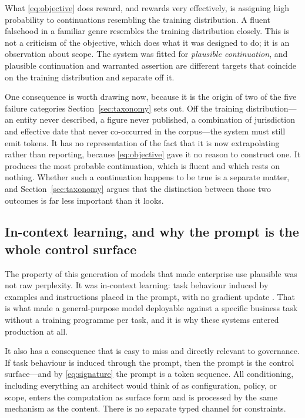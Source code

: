 \documentclass[11pt]{article}
\theoremstyle{plain}
\theoremstyle{definition}
\begin{document}
What \eqref{eq:objective} does reward, and rewards very effectively, is assigning
high probability to continuations resembling the training distribution. A fluent
falsehood in a familiar genre resembles the training distribution closely. This is
not a criticism of the objective, which does what it was designed to do; it is an
observation about scope. The system was fitted for \emph{plausible continuation},
and plausible continuation and warranted assertion are different targets that
coincide on the training distribution and separate off it.

One consequence is worth drawing now, because it is the origin of two of the
five failure categories Section~\ref{sec:taxonomy} sets out. Off the training
distribution---an entity never described, a figure never published, a combination
of jurisdiction and effective date that never co-occurred in the corpus---the
system must still emit tokens. It has no representation of the fact that it is now
extrapolating rather than reporting, because \eqref{eq:objective} gave it no
reason to construct one. It produces the most probable continuation, which is
fluent and which rests on nothing. Whether such a continuation happens to be true
is a separate matter, and Section~\ref{sec:taxonomy} argues that the distinction
between those two outcomes is far less important than it looks.

\subsection{In-context learning, and why the prompt is the whole control surface}
\label{sec:icl}

The property of this generation of models that made enterprise use plausible was
not raw perplexity. It was in-context learning: task behaviour induced by
examples and instructions placed in the prompt, with no gradient update
\citep{brown2020}. That is what made a general-purpose model deployable against a
specific business task without a training programme per task, and it is why these
systems entered production at all.

It also has a consequence that is easy to miss and directly relevant to
governance. If task behaviour is induced through the prompt, then the prompt is the
control surface---and by \eqref{eq:signature} the prompt is a token sequence. All
conditioning, including everything an architect would think of as configuration,
policy, or scope, enters the computation as surface form and is processed by the
same mechanism as the content. There is no separate typed channel for constraints.
\end{document}
